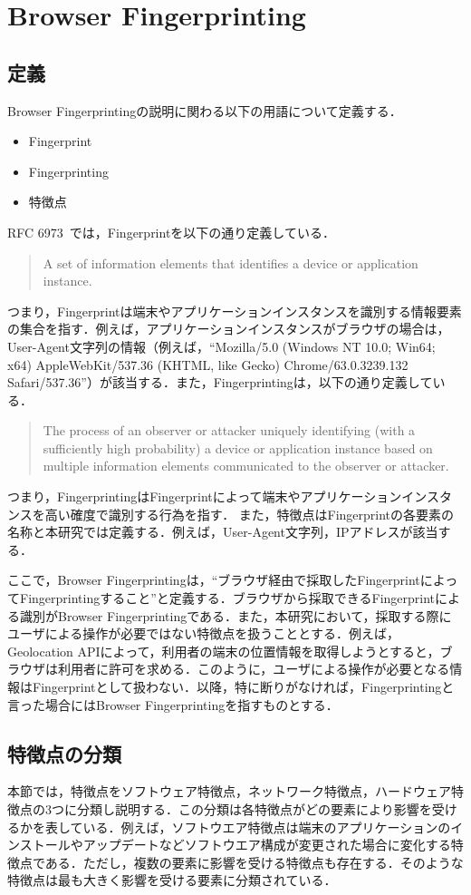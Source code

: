 \newpage
\section{Browser Fingerprinting}
\subsection{定義}
Browser Fingerprintingの説明に関わる以下の用語について定義する．
\begin{itemize}
 \item Fingerprint
 \item Fingerprinting
 \item 特徴点
\end{itemize}
RFC 6973~\cite{rfc6973}では，Fingerprintを以下の通り定義している．
\begin{quote}
A set of information elements that identifies a device or application instance.
\end{quote}
つまり，Fingerprintは端末やアプリケーションインスタンスを識別する情報要素の集合を指す．例えば，アプリケーションインスタンスがブラウザの場合は，User-Agent文字列の情報（例えば，``Mozilla/5.0 (Windows NT 10.0; Win64; x64) AppleWebKit/537.36 (KHTML, like Gecko) Chrome/63.0.3239.132 Safari/537.36''）が該当する．また，Fingerprintingは，以下の通り定義している．
\begin{quote}
The process of an observer or attacker uniquely identifying (with a sufficiently high probability) a device or application instance based on multiple information elements communicated to the observer or attacker.
\end{quote}
つまり，FingerprintingはFingerprintによって端末やアプリケーションインスタンスを高い確度で識別する行為を指す．
また，特徴点はFingerprintの各要素の名称と本研究では定義する．例えば，User-Agent文字列，IPアドレスが該当する．

ここで，Browser Fingerprintingは，``ブラウザ経由で採取したFingerprintによってFingerprintingすること''と定義する．ブラウザから採取できるFingerprintによる識別がBrowser Fingerprintingである．また，本研究において，採取する際にユーザによる操作が必要ではない特徴点を扱うこととする．例えば，Geolocation APIによって，利用者の端末の位置情報を取得しようとすると，ブラウザは利用者に許可を求める．このように，ユーザによる操作が必要となる情報はFingerprintとして扱わない．以降，特に断りがなければ，Fingerprintingと言った場合にはBrowser Fingerprintingを指すものとする．

\subsection{特徴点の分類}
本節では，特徴点をソフトウェア特徴点，ネットワーク特徴点，ハードウェア特徴点の3つに分類し説明する．この分類は各特徴点がどの要素により影響を受けるかを表している．例えば，ソフトウエア特徴点は端末のアプリケーションのインストールやアップデートなどソフトウエア構成が変更された場合に変化する特徴点である．ただし，複数の要素に影響を受ける特徴点も存在する．そのような特徴点は最も大きく影響を受ける要素に分類されている．
